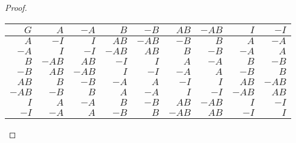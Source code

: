 \documentclass{article}
\begin{document}
\begin{enumerate}
\begin{proof}
\begin{center}
\begin{tabular}{|r||r|r|r|r|r|r|r|r|}
          \hline
          $G$       & $A$   & $-A$  & $B$   & $-B$  & $AB$  & $-AB$ & $I$   & $-I$ \\
          \hline\hline
          $A$       & $-I$  & $I$   & $AB$  & $-AB$ & $-B$  & $B$   & $A$   & $-A$ \\
          \hline
          $-A$      & $I$   & $-I$  & $-AB$ & $AB$  & $B$   & $-B$  & $-A$  & $A$ \\
          \hline
          $B$       & $-AB$ & $AB$  & $-I$  & $I$   & $A$   & $-A$  & $B$   & $-B$ \\
          \hline
          $-B$      & $AB$  & $-AB$ & $I$   & $-I$  & $-A$  & $A$   & $-B$  & $B$ \\
          \hline
          $AB$      & $B$   & $-B$  & $-A$  & $A$   & $-I$  & $I$   & $AB$  & $-AB$ \\
          \hline
          $-AB$     & $-B$  & $B$   & $A$   & $-A$  & $I$   & $-I$  & $-AB$ & $AB$ \\
          \hline
          $I$       & $A$   & $-A$  & $B$   & $-B$  & $AB$  & $-AB$ & $I$   & $-I$ \\
          \hline
          $-I$      & $-A$  & $A$   & $-B$  & $B$   & $-AB$ & $AB$  & $-I$  & $I$ \\
          \hline
        \end{tabular}
      \end{center}
    \end{proof}


\end{enumerate}
\end{document}
